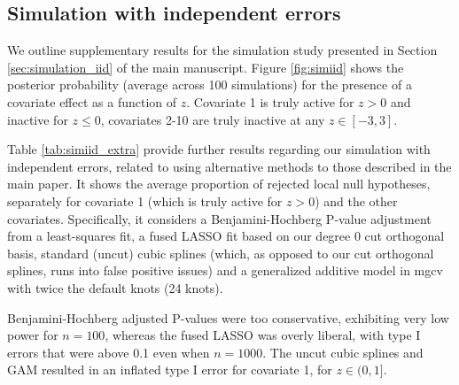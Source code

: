 \subsection{Simulation with independent errors}
\label{ssec:simulation_iid}

We outline supplementary results for the simulation study presented in Section \ref{sec:simulation_iid} of the main manuscript.
Figure \ref{fig:simiid} shows the posterior probability (average across 100 simulations) for the presence of a covariate effect as a function of $z$.
Covariate 1 is truly active for $z>0$ and inactive for $z \leq 0$, covariates 2-10 are truly inactive at any $z \in [-3,3]$.


Table \ref{tab:simiid_extra} provide further results regarding our simulation with independent errors, related to using alternative methods to those described in the main paper.
It shows the average proportion of rejected local null hypotheses, separately for covariate 1 (which is truly active for $z>0$) and the other covariates.
Specifically, it considers a Benjamini-Hochberg P-value adjustment from a least-squares fit, a fused LASSO fit based on our degree 0 cut orthogonal basis, standard (uncut) cubic splines (which, as opposed to our cut orthogonal splines, runs into false positive issues) and a generalized additive model in mgcv with twice the default knots (24 knots).

Benjamini-Hochberg adjusted P-values were too conservative, exhibiting very low power for $n=100$, whereas the fused LASSO was overly liberal, with type I errors that were above 0.1 even when $n=1000$.
The uncut cubic splines and GAM resulted in an inflated type I error for covariate 1, for $z \in (0,1]$.


